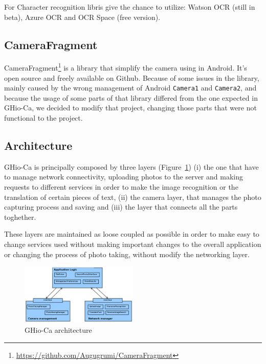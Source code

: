 For Character recognition libris give the chance to utilize: Watson OCR (still in 
beta), Azure OCR and OCR Space (free version).

\subsection{CameraFragment}
CameraFragment\footnote{\url{https://github.com/Augugrumi/CameraFragment}} is a library that simplify the camera using in Android. It's 
open source and freely available on Github. Because of some
issues in the library, mainly caused by the wrong management of Android \texttt{Camera1} 
and \texttt{Camera2}, and because the usage of some parts of that library differed from 
the one expected in GHio-Ca, we decided to modify that project, changing those 
parts that were not functional to the project.

\subsection{Architecture}
GHio-Ca is principally composed by three layers (Figure~\ref{fig:architecture})
(i) the one that have to manage network connectivity, uploading photos to the
server and making requests to different services in order to make the image 
recognition or the translation of certain pieces of text, (ii) the camera layer, 
that manages the photo capturing process and saving and (iii) the layer that
connects all the parts toghether. 

These layers are maintained as loose coupled as possible in order to make 
easy to change services used without making important changes to the overall 
application or changing the process of photo taking, without modify the 
networking layer.

\begin{figure}[h]
    \centering
    \includegraphics[width=0.50\textwidth]{../img/ghioca_macro_component}
    \caption{GHio-Ca architecture}
    \label{fig:architecture}
\end{figure}

